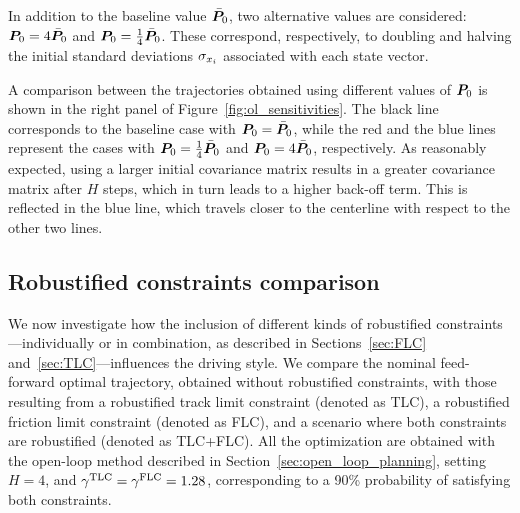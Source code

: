 In addition to the baseline value $\bar{\boldsymbol{P}}_0$, two alternative values are considered: $\boldsymbol{P}_0 = 4\bar{\boldsymbol{P}}_0$ and $\boldsymbol{P}_0 = \frac{1}{4}\bar{\boldsymbol{P}}_0$. These correspond, respectively, to doubling and halving the initial standard deviations $\sigma_{x_i}$ associated with each state vector.

A comparison between the trajectories obtained using different values of $\boldsymbol{P}_0$ is shown in the right panel of Figure~\ref{fig:ol_sensitivities}.
The black line corresponds to the baseline case with $\boldsymbol{P}_0 = \bar{\boldsymbol{P}}_0$, while the red and the blue lines represent the cases with $\boldsymbol{P}_0 = \frac{1}{4}\bar{\boldsymbol{P}}_0$ and $\boldsymbol{P}_0 = 4\bar{\boldsymbol{P}}_0$, respectively. As reasonably expected, using a larger initial covariance matrix results in a greater covariance matrix after $H$ steps, which in turn leads to a higher back-off term. This is reflected in the blue line, which travels closer to the centerline with respect to the other two lines.

\subsection{Robustified constraints comparison}
We now investigate how the inclusion of different kinds of robustified constraints---individually or in combination, as described in Sections~\ref{sec:FLC} and~\ref{sec:TLC}---influences the driving style.
We compare the nominal feed-forward optimal trajectory, obtained without robustified constraints, with those resulting from a robustified track limit constraint (denoted as TLC), a robustified friction limit constraint (denoted as FLC), and a scenario where both constraints are robustified (denoted as TLC+FLC). All the optimization are obtained with the open-loop method described in Section~\ref{sec:open_loop_planning}, setting $H=4$, and $\gamma^\textrm{TLC}=\gamma^\textrm{FLC}=1.28$, corresponding to a 90\% probability of satisfying both constraints.

